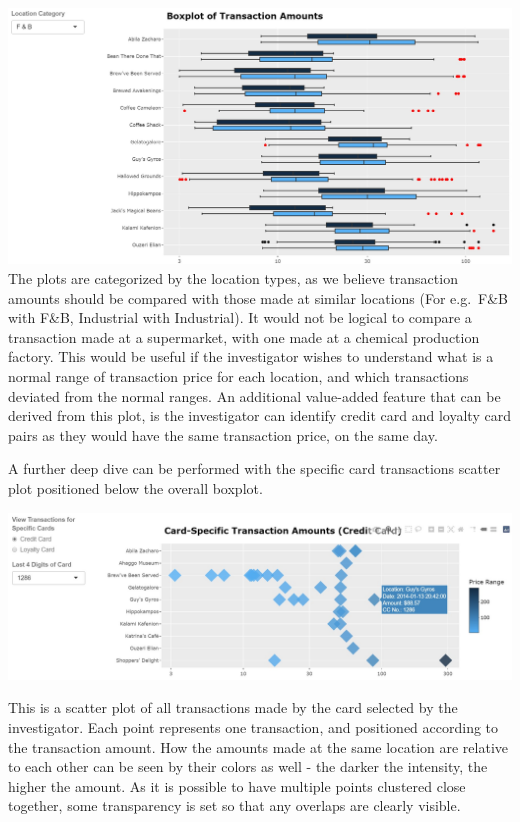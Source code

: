 \documentclass{acm_proc_article-sp}
\begin{document}
\includegraphics{img/P03BoxPlot.jpg} The plots are categorized by the
location types, as we believe transaction amounts should be compared
with those made at similar locations (For e.g.~F\&B with F\&B,
Industrial with Industrial). It would not be logical to compare a
transaction made at a supermarket, with one made at a chemical
production factory. This would be useful if the investigator wishes to
understand what is a normal range of transaction price for each
location, and which transactions deviated from the normal ranges. An
additional value-added feature that can be derived from this plot, is
the investigator can identify credit card and loyalty card pairs as they
would have the same transaction price, on the same day.

A further deep dive can be performed with the specific card transactions
scatter plot positioned below the overall boxplot.

\includegraphics{img/P04SpecCardTxn.jpg}

This is a scatter plot of all transactions made by the card selected by
the investigator. Each point represents one transaction, and positioned
according to the transaction amount. How the amounts made at the same
location are relative to each other can be seen by their colors as well
- the darker the intensity, the higher the amount. As it is possible to
have multiple points clustered close together, some transparency is set
so that any overlaps are clearly visible.
\end{document}
